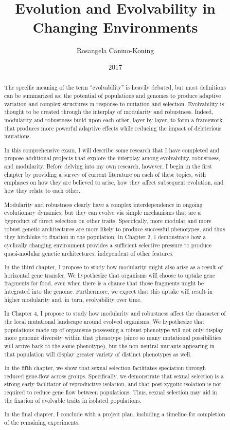 \documentclass[PhD]{msu-thesis}
\title{Evolution and Evolvability in Changing Environments}
\author{Rosangela Canino-Koning}
\date{2017}
\begin{document}
\frontmatter
%
\maketitlepage
%
\begin{abstract}
The specific meaning of the term ``evolvability'' is heavily debated, but most definitions can be summarized as: the potential of populations and genomes to produce adaptive variation and complex structures in response to mutation and selection. Evolvability is thought to be created through the interplay of modularity and robustness. Indeed, modularity and robustness build upon each other, layer by layer, to form a framework that produces more powerful adaptive effects while reducing the impact of deleterious mutations.

In this comprehensive exam, I will describe some research that I have completed and propose additional projects that explore the interplay among evolvability, robustness, and modularity. Before delving into my own research, however, I begin in the first chapter by providing a survey of current literature on each of these topics, with emphases on how they are believed to arise, how they affect subsequent evolution, and how they relate to each other.

Modularity and robustness clearly have a complex interdependence in ongoing evolutionary dynamics, but they can evolve via simple mechanisms that are a byproduct of direct selection on other traits. Specifically, more modular and more robust genetic architectures are more likely to produce successful phenotypes, and thus they hitchhike to fixation in the population. In Chapter 2, I demonstrate how a cyclically changing environment provides a sufficient selective pressure to produce quasi-modular genetic architectures, independent of other features.

In the third chapter, I propose to study how modularity might also arise as a result of horizontal gene transfer. We hypothesize that organisms will choose to uptake gene fragments for food, even when there is a chance that those fragments might be integrated into the genome. Furthermore, we expect that this uptake will result in higher modularity and, in turn, evolvability over time.

In Chapter 4, I propose to study how modularity and robustness affect the character of the local mutational landscape around evolved organisms. We hypothesize that populations made up of organisms possessing a robust phenotype will not only display more genomic diversity within that phenotype (since so many mutational possibilities will arrive back to the same phenotype), but the non-neutral mutants appearing in that population will display greater variety of distinct phenotypes as well. 

In the fifth chapter, we show that sexual selection facilitates speciation through reduced gene-flow across groups. Specifically, we demonstrate that sexual selection is a strong early facilitator of reproductive isolation, and that post-zygotic isolation is not required to reduce gene flow between populations. Thus, sexual selection may aid in the fixation of evolvable traits in isolated populations.

In the final chapter, I conclude with a project plan, including a timeline for completion of the remaining experiments.
\end{abstract}
\end{document}
